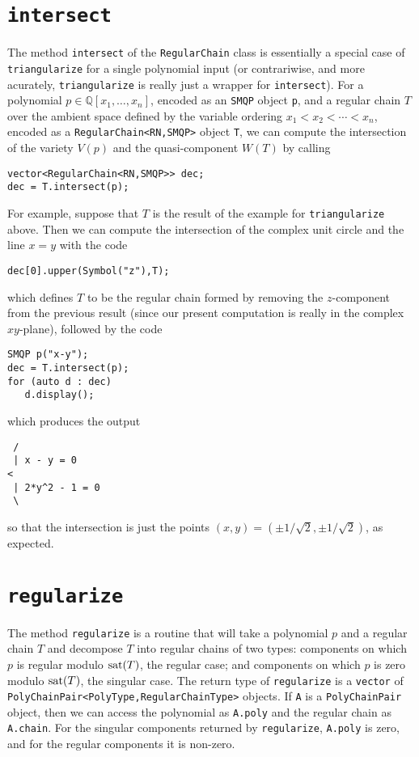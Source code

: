 \section{\texttt{intersect}}
The method \texttt{intersect} of the \texttt{RegularChain} class is essentially a special case of \texttt{triangularize} for a single polynomial input (or contrariwise, and more acurately, \texttt{triangularize} is really just a wrapper for \texttt{intersect}). For a polynomial $p\in\mathbb{Q}[x_1,\ldots,x_n]$, encoded as an \texttt{SMQP} object \texttt{p}, and a regular chain $T$ over the ambient space defined by the variable ordering $x_1<x_2<\cdots<x_n$, encoded as a \texttt{RegularChain<RN,SMQP>} object \texttt{T},  we can compute the intersection of the variety $V(p)$ and the quasi-component $W(T)$ by calling
\begin{verbatim}
vector<RegularChain<RN,SMQP>> dec;
dec = T.intersect(p);
\end{verbatim}
For example, suppose that $T$ is the result of the example for \texttt{triangularize} above. Then we can compute the intersection of the complex unit circle and the line $x=y$ with the code
\begin{verbatim}
dec[0].upper(Symbol("z"),T);
\end{verbatim}
which defines $T$ to be the regular chain formed by removing the $z$-component from the previous result (since our present computation is really in the complex $xy$-plane), followed by the code
\begin{verbatim}
SMQP p("x-y");
dec = T.intersect(p);
for (auto d : dec)
   d.display();
\end{verbatim}
which produces the output
\begin{verbatim}
 /
 | x - y = 0
< 
 | 2*y^2 - 1 = 0
 \
\end{verbatim}
so that the intersection is just the points $(x,y)=\left(\pm1/\sqrt{2},\pm1/\sqrt{2}\right)$, as expected.

\section{\texttt{regularize}}
The method \texttt{regularize} is a routine that will take a polynomial $p$ and a regular chain $T$ and decompose $T$ into regular chains of two types: components on which $p$ is regular modulo $\mbox{{\rm sat}$(T)$}$, the regular case; and  components on which $p$ is zero modulo $\mbox{{\rm sat}$(T)$}$, the singular case. The return type of \texttt{regularize} is a \texttt{vector} of \texttt{PolyChainPair<PolyType,RegularChainType>} objects. If \texttt{A} is a  \texttt{PolyChainPair} object, then we can access the polynomial as \texttt{A.poly} and the regular chain as \texttt{A.chain}. For the singular components returned by \texttt{regularize}, \texttt{A.poly} is zero, and for the regular components it is non-zero.\\

